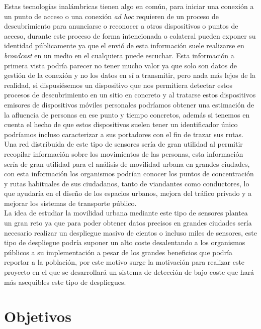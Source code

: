 \documentclass[../proyecto.tex]{subfiles}
\begin{document}
Estas tecnologías inalámbricas tienen algo en común, para iniciar una conexión a un punto de acceso o una conexión \textit{ad hoc} requieren de un proceso de descubrimiento para anunciarse o reconocer a otros dispositivos o puntos de acceso, durante este proceso de forma intencionada o colateral pueden exponer su identidad públicamente ya que el envió de esta información suele realizarse en \textit{broadcast} en un medio en el cualquiera puede escuchar. Esta información a primera vista podría parecer no tener mucho valor ya que solo son datos de gestión de la conexión y no los datos en sí a transmitir, pero nada más lejos de la realidad, si dispusiésemos un dispositivo que nos permitiera detectar estos procesos de descubrimiento en un sitio en concreto y al tratarse estos dispositivos emisores de dispositivos móviles personales podríamos obtener una estimación de la afluencia de personas en ese punto y tiempo concretos, además si tenemos en cuenta el hecho de que estos dispositivos suelen tener un identificador único podríamos incluso caracterizar a sus portadores con el fin de trazar sus rutas.\\

Una red distribuida de este tipo de sensores sería de gran utilidad al permitir recopilar información sobre los movimientos de las personas, esta información sería de gran utilidad para el análisis de movilidad urbana en grandes ciudades, con esta información los organismos podrían conocer los puntos de concentración y rutas habituales de sus ciudadanos, tanto de viandantes como conductores, lo que ayudaría en el diseño de los espacios urbanos, mejora del tráfico privado y a mejorar los sistemas de transporte público.\\

La idea de estudiar la movilidad urbana mediante este tipo de sensores plantea un gran reto ya que para poder obtener datos precisos en grandes ciudades sería necesario realizar un despliegue masivo de cientos o incluso miles de sensores, este tipo de despliegue podría suponer un alto coste desalentando a los organismos públicos a su implementación a pesar de los grandes beneficios que podría reportar a la población, por este motivo surge la motivación para realizar este proyecto en el que se desarrollará un sistema de detección de bajo coste que hará más asequibles este tipo de despliegues.\\

\section{Objetivos}
\end{document}
